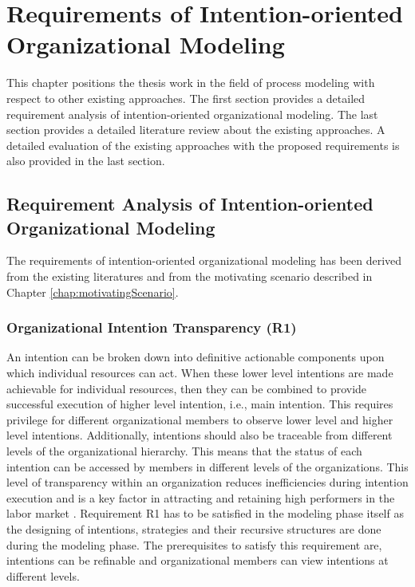 \chapter{Requirements of Intention-oriented Organizational Modeling}
\label{chap:analysis}
This chapter positions the thesis work in the field of process modeling with respect to other existing approaches. The first section provides a detailed requirement analysis of intention-oriented organizational modeling. The last section provides a detailed literature review about the existing approaches. A detailed evaluation of the existing approaches with the proposed requirements is also provided in the last section.

\section{Requirement Analysis of Intention-oriented Organizational Modeling}
\label{sec:requirementssupoorting}
The requirements of intention-oriented organizational modeling has been derived from the existing literatures \cite{McManus2007, Mandic2010,Bleistein2006, Lacom, Brambilla2012} and from the motivating scenario described in Chapter \ref{chap:motivatingScenario}. 

\subsection{Organizational Intention Transparency (R1)}
An intention can be broken down into definitive actionable components upon which individual resources can act. When these lower level intentions are made achievable for individual resources, then they can be combined to provide successful execution of higher level intention, i.e., main intention. This requires privilege for different organizational members to observe lower level and higher level intentions. Additionally, intentions should also be traceable from different levels of the organizational hierarchy. This means that the status of each intention can be accessed by members in different levels of the organizations. This level of transparency within an organization reduces inefficiencies during intention execution and is a key factor in attracting and retaining high performers in the labor market \cite{McManus2007}. Requirement R1 has to be satisfied in the modeling phase itself as the designing of intentions, strategies and their recursive structures are done during the modeling phase. The prerequisites to satisfy this requirement are, intentions can be refinable and organizational members can view intentions at different levels. 

